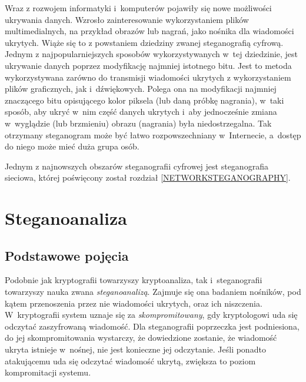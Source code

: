 \documentclass[a4paper, twoside, 12pt]{report}
\begin{document}
        Wraz z rozwojem informatyki i~komputerów pojawiły się nowe możliwości
        ukrywania danych. Wzrosło zainteresowanie wykorzystaniem plików
        multimedialnych, na przykład obrazów lub nagrań, jako nośnika dla wiadomości
        ukrytych. Wiąże się to z powstaniem dziedziny zwanej steganografią cyfrową.
        Jednym z najpopularniejszych sposobów wykorzystywanych w~tej dziedzinie,
        jest ukrywanie danych poprzez modyfikację najmniej istotnego bitu. Jest
        to metoda wykorzystywana zarówno do transmisji wiadomości ukrytych z wykorzystaniem
        plików graficznych\cite{LSBSTEGANGRAPHY}, jak i~dźwiękowych\cite{AUDIOLSBSTEGANGRAPHY}.
        Polega ona na modyfikacji najmniej znaczącego bitu opisującego kolor piksela
        (lub daną próbkę nagrania), w~taki sposób, aby ukryć w~nim część danych
        ukrytych i~aby jednocześnie zmiana w~wyglądzie (lub brzmieniu) obrazu (nagrania)
        była niedostrzegalna. Tak otrzymany steganogram może być łatwo rozpowszechniany
        w~Internecie, a~dostęp do niego może mieć duża grupa osób.

        Jednym z najnowszych obszarów steganografii cyfrowej jest steganografia
        sieciowa, której poświęcony został rozdział \ref{NETWORKSTEGANOGRAPHY}.

    \section{Steganoanaliza}
        \subsection{Podstawowe pojęcia}
        Podobnie jak kryptografii towarzyszy kryptoanaliza, tak i~steganografii
        towarzyszy nauka zwana \emph{steganoanalizą}. Zajmuje się ona badaniem
        nośników, pod kątem przenoszenia przez nie wiadomości ukrytych, oraz ich niszczenia.
        W~kryptografii system uznaje się
        za \emph{skompromitowany}, gdy kryptologowi uda się odczytać zaszyfrowaną wiadomość.
        Dla steganografii poprzeczka jest podniesiona, do jej skompromitowania wystarczy,
        że dowiedzione zostanie, że wiadomość ukryta istnieje w~nośnej, nie jest
        konieczne jej odczytanie. Jeśli ponadto atakującemu uda się odczytać wiadomość
        ukrytą, zwiększa to poziom kompromitacji systemu.
\end{document}
